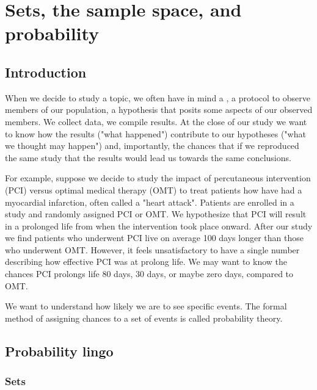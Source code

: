 \chapter{Sets, the sample space, and probability}
\hspace{1mm}

\section{Introduction}\label{intro}

When we decide to study a topic, we often have in mind a , a protocol to observe members of our population, a hypothesis that posits some aspects of our observed members.
We collect data, we compile results.
At the close of our study we want to know how the results ("what happened") contribute to our hypotheses ("what we thought may happen") and, importantly, the chances that if we reproduced the same study that the results would lead us towards the same conclusions.  

For example, suppose we decide to study the impact of percutaneous intervention (PCI) versus optimal medical therapy (OMT) to treat patients how have had a myocardial infarction, often called a "heart attack".
Patients are enrolled in a study and randomly assigned PCI or OMT.
We hypothesize that PCI will result in a prolonged life from when the intervention took place onward.
After our study we find patients who underwent PCI live on average 100 days longer than those who underwent OMT. 
However, it feels unsatisfactory to have a single number describing how effective PCI was at prolong life. 
We may want to know the chances PCI prolongs life 80 days, 30 days, or maybe zero days, compared to OMT. 

We want to understand how likely we are to see specific events.
The formal method of assigning chances to a set of events is called probability theory.

\section{Probability lingo}
\hspace{1mm}
\subsection{Sets}

